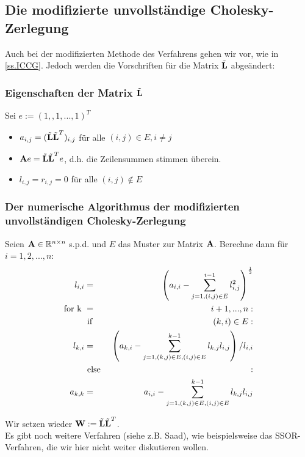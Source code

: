 \subsection{Die modifizierte unvollständige Cholesky-Zerlegung}\label{ss.Modifizierte Cholesky}

Auch bei der modifizierten Methode des Verfahrens gehen wir vor, wie in \autoref{ss.ICCG}. Jedoch werden die Vorschriften für die Matrix $\tilde{{\textbf{L}}}$ abgeändert:

\subsubsection{Eigenschaften der Matrix $\tilde{{\textbf{L}}}$}\label{sss.Eigenschaften L MCZ}

Sei $e := (1,,1,...,1)^{T}$

\begin{itemize}
\item $a_{i,j} = (\tilde{{\textbf{L}}} \tilde{{\textbf{L}}}^{T})_{i,j}$ für alle $(i,j) \in E, i \ne j$
\item ${\textbf{A}} e = \tilde{{\textbf{L}}} \tilde{{\textbf{L}}}^{T} e$, d.h. die Zeilensummen stimmen überein.
\item $l_{i,j} = r_{i,j} = 0$ für alle $(i,j) \notin E$
\end{itemize}

\subsubsection{Der numerische Algorithmus der modifizierten unvollständigen Cholesky-Zerlegung}\label{sss.Algorithmus MUCZ}

Seien ${\textbf{A}} \in \mathbb{R}^{n \times n}$ s.p.d. und $E$ das Muster zur Matrix ${\textbf{A}}$. Berechne dann für $i=1,2,...,n$:
\begin{eqnarray}
l_{i,i} &=& \left( a_{i,i} - \sum^{i-1}_{j=1,(i,j) \in E} l_{i,j}^{2} \right)^{\frac {1} {2}} \\
\textnormal{for k } &=& i+1,...,n: \\
&\textnormal{ if }& (k,i) \in E: \\
l_{k,i} &=& \left( a_{k,i} - \sum^{k-1}_{j=1,(k,j) \in E, (i,j) \in E} l_{k,j} l_{i,j} \right) / l_{i,i} \\
&\textnormal{ else }&:\\
a_{k,k} &=& a_{i,i} - \sum^{k-1}_{j=1,(k,j) \in E, (i,j) \in E} l_{k,j} l_{i,j}
\end{eqnarray}

Wir setzen wieder ${\textbf{W}} := \tilde{{\textbf{L}}} \tilde{{\textbf{L}}}^{T}$. \\
Es gibt noch weitere Verfahren (siehe z.B. Saad), wie beispielsweise das SSOR-Verfahren, die wir hier nicht weiter diskutieren wollen.
